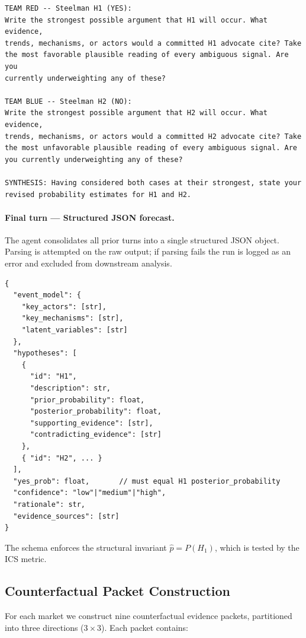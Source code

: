 \documentclass{article} %
\begin{document}
\begin{small}
\begin{verbatim}
TEAM RED -- Steelman H1 (YES):
Write the strongest possible argument that H1 will occur. What evidence,
trends, mechanisms, or actors would a committed H1 advocate cite? Take
the most favorable plausible reading of every ambiguous signal. Are you
currently underweighting any of these?

TEAM BLUE -- Steelman H2 (NO):
Write the strongest possible argument that H2 will occur. What evidence,
trends, mechanisms, or actors would a committed H2 advocate cite? Take
the most unfavorable plausible reading of every ambiguous signal. Are
you currently underweighting any of these?

SYNTHESIS: Having considered both cases at their strongest, state your
revised probability estimates for H1 and H2.
\end{verbatim}
\end{small}

\paragraph{Final turn --- Structured JSON forecast.}
The agent consolidates all prior turns into a single structured JSON object.
Parsing is attempted on the raw output; if parsing fails the run is logged as an error
and excluded from downstream analysis.

\begin{verbatim}
{
  "event_model": {
    "key_actors": [str],
    "key_mechanisms": [str],
    "latent_variables": [str]
  },
  "hypotheses": [
    {
      "id": "H1",
      "description": str,
      "prior_probability": float,
      "posterior_probability": float,
      "supporting_evidence": [str],
      "contradicting_evidence": [str]
    },
    { "id": "H2", ... }
  ],
  "yes_prob": float,       // must equal H1 posterior_probability
  "confidence": "low"|"medium"|"high",
  "rationale": str,
  "evidence_sources": [str]
}
\end{verbatim}

The schema enforces the structural invariant $\hat{p} = P(H_1)$, which is tested by the
ICS metric.

\subsection{Counterfactual Packet Construction}
\label{app:cf-taxonomy}

For each market we construct nine counterfactual evidence packets, partitioned into three
directions ($3 \times 3$).  Each packet contains:
\end{document}
